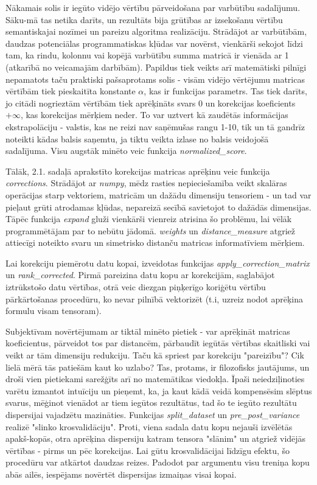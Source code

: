 \documentclass[12pt, a4paper]{article}
\begin{document}
Nākamais solis ir iegūto vidējo vērtību pārveidošana par varbūtību sadalījumu. Sāku-mā tas netika darīts, un rezultāts bija grūtības ar izsekošanu vērtību semantiskajai nozīmei un pareizu algoritma realizāciju. Strādājot ar varbūtībām, daudzas potenciālas programmatiskas kļūdas var novērst, vienkārši sekojot līdzi tam, ka rindu, kolonnu vai kopējā varbūtību summa matricā ir vienāda ar 1 (atkarībā no veicamajām darbībām). Papildus tiek veikts arī matemātiski pilnīgi nepamatots taču praktiski pašsaprotams solis - visām vidējo vērtējumu matricas vērtībām tiek pieskaitīta konstante $\alpha$, kas ir funkcijas parametrs. Tas tiek darīts, jo citādi nogrieztām vērtībām tiek aprēķināts svars 0 un korekcijas koeficients $+\infty$, kas korekcijas mērķiem neder. To var uztvert kā zaudētās informācijas ekstrapolāciju - valstis, kas ne reizi nav saņēmušas rangu 1-10, tik un tā gandrīz noteikti kādas balsis saņemtu, ja tiktu veikta izlase no balsis veidojošā sadalījuma. Visu augstāk minēto veic funkcija \textit{normalized\_score}.

Tālāk, 2.1. sadaļā aprakstīto korekcijas matricas aprēķinu veic funkcija \textit{corrections}. Strādājot ar \textit{numpy}, mēdz rasties nepieciešamība veikt skalāras operācijas starp vektoriem, matricām un dažādu dimensiju tensoriem - un tad var pieļaut grūti atrodamas kļūdas, nepareizā secībā savietojot to dažādās dimensijas. Tāpēc funkcija \textit{expand} gluži vienkārši vienreiz atrisina šo problēmu, lai vēlāk programmētājam par to nebūtu jādomā. \textit{weights} un \textit{distance\_measure} atgriež attiecīgi noteikto svaru un simetrisko distanču matricas informatīviem mērķiem.

Lai korekciju piemērotu datu kopai, izveidotas funkcijas \textit{apply\_correction\_matrix} un \textit{rank\_corrected}. Pirmā pareizina datu kopu ar korekcijām, saglabājot iztrūkstošo datu vērtības, otrā veic diezgan piņķerīgo koriģētu vērtību pārkārtošanas procedūru, ko nevar pilnībā vektorizēt (t.i, uzreiz nodot aprēķina formulu visam tensoram).

Subjektīvam novērtējumam ar tiktāl minēto pietiek - var aprēķināt matricas koeficientus, pārveidot tos par distancēm, pārbaudīt iegūtās vērtības skaitliski vai veikt ar tām dimensiju redukciju. Taču kā spriest par korekciju "pareizību"? Cik lielā mērā tās patiešām kaut ko uzlabo? Tas, protams, ir filozofisks jautājums, un droši vien pietiekami sarežģīts arī no matemātikas viedokļa. Īpaši neiedziļinoties varētu izmantot intuīciju un pieņemt, ka, ja kaut kādā veidā kompensēsim slēptus svarus, mēģinot vienādot ar tiem iegūtos rezultātus, tad šo te iegūto rezultātu dispersijai vajadzētu mazināties. Funkcijas \textit{split\_dataset} un \textit{pre\_post\_variance} realizē "slinko krosvalidāciju". Proti, viena sadala datu kopu nejauši izvēlētās apakš-kopās, otra aprēķina dispersiju katram tensora "slānim" un atgriež vidējās vērtības - pirms un pēc korekcijas. Lai gūtu krosvalidācijai līdzīgu efektu, šo procedūru var atkārtot daudzas reizes. Padodot par argumentu visu treniņa kopu abās ailēs, iespējams novērtēt dispersijas izmaiņas visai kopai.
\end{document}
